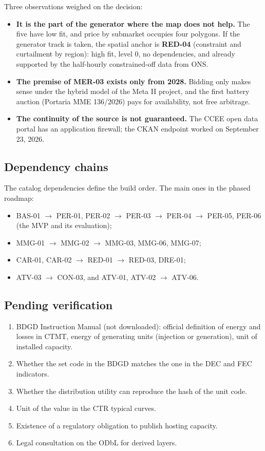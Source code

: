 Three observations weighed on the decision:
\begin{itemize}
  \item \textbf{It is the part of the generator where the map does not help.}
    The five have low fit, and price by submarket occupies four polygons. If
    the generator track is taken, the spatial anchor is \textbf{RED-04}
    (constraint and curtailment by region): high fit, level 0, no
    dependencies, and already supported by the half-hourly constrained-off
    data from ONS.
  \item \textbf{The premise of MER-03 exists only from 2028.} Bidding only
    makes sense under the hybrid model of the Meta II project, and the first
    battery auction (Portaria MME 136/2026) pays for availability, not free
    arbitrage.
  \item \textbf{The continuity of the source is not guaranteed.} The CCEE
    open data portal has an application firewall; the CKAN endpoint worked on
    September 23, 2026.
\end{itemize}

\subsection*{Dependency chains}

The catalog dependencies define the build order. The main ones in the phased
roadmap:
\begin{itemize}
  \item BAS-01 $\rightarrow$ PER-01, PER-02 $\rightarrow$ PER-03 $\rightarrow$
    PER-04 $\rightarrow$ PER-05, PER-06 (the MVP and its evaluation);
  \item MMG-01 $\rightarrow$ MMG-02 $\rightarrow$ MMG-03, MMG-06, MMG-07;
  \item CAR-01, CAR-02 $\rightarrow$ RED-01 $\rightarrow$ RED-03, DRE-01;
  \item ATV-03 $\rightarrow$ CON-03, and ATV-01, ATV-02 $\rightarrow$ ATV-06.
\end{itemize}

\subsection*{Pending verification}

\begin{enumerate}
  \item BDGD Instruction Manual (not downloaded): official definition of
    energy and losses in CTMT, energy of generating units (injection or
    generation), unit of installed capacity.
  \item Whether the set code in the BDGD matches the one in the DEC and FEC
    indicators.
  \item Whether the distribution utility can reproduce the hash of the unit
    code.
  \item Unit of the value in the CTR typical curves.
  \item Existence of a regulatory obligation to publish hosting capacity.
  \item Legal consultation on the ODbL for derived layers.
\end{enumerate}
